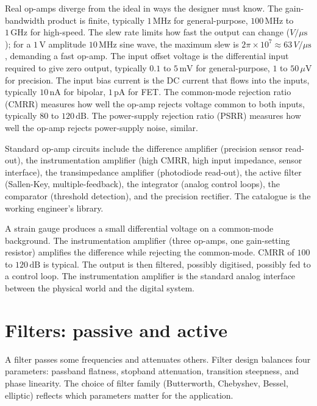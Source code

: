 Real op-amps diverge from the ideal in ways the designer must know. The gain-bandwidth product is finite, typically $1\,\text{MHz}$ for general-purpose, $100\,\text{MHz}$ to $1\,\text{GHz}$ for high-speed. The slew rate limits how fast the output can change ($V/\mu\text{s}$); for a $1\,\text{V}$ amplitude $10\,\text{MHz}$ sine wave, the maximum slew is $2\pi \times 10^7 \approx 63\,V/\mu\text{s}$, demanding a fast op-amp. The input offset voltage is the differential input required to give zero output, typically $0.1$ to $5\,\text{mV}$ for general-purpose, $1$ to $50\,\mu\text{V}$ for precision. The input bias current is the DC current that flows into the inputs, typically $10\,\text{nA}$ for bipolar, $1\,\text{pA}$ for FET. The common-mode rejection ratio (CMRR) measures how well the op-amp rejects voltage common to both inputs, typically $80$ to $120\,\text{dB}$. The power-supply rejection ratio (PSRR) measures how well the op-amp rejects power-supply noise, similar.

Standard op-amp circuits include the difference amplifier (precision sensor read-out), the instrumentation amplifier (high CMRR, high input impedance, sensor interface), the transimpedance amplifier (photodiode read-out), the active filter (Sallen-Key, multiple-feedback), the integrator (analog control loops), the comparator (threshold detection), and the precision rectifier. The catalogue is the working engineer's library.

\begin{archetype}
A strain gauge produces a small differential voltage on a common-mode background. The instrumentation amplifier (three op-amps, one gain-setting resistor) amplifies the difference while rejecting the common-mode. CMRR of $100$ to $120\,\text{dB}$ is typical. The output is then filtered, possibly digitised, possibly fed to a control loop. The instrumentation amplifier is the standard analog interface between the physical world and the digital system.
\end{archetype}

\section{Filters: passive and active}

A filter passes some frequencies and attenuates others. Filter design balances four parameters: passband flatness, stopband attenuation, transition steepness, and phase linearity. The choice of filter family (Butterworth, Chebyshev, Bessel, elliptic) reflects which parameters matter for the application.

